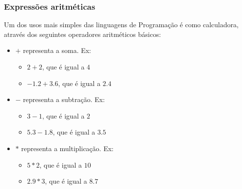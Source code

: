 \documentclass{beamer}
\begin{document}
\begin{frame}
    \frametitle{Expressões aritméticas}
        Um dos usos mais simples das linguagens de Programação é como
        calculadora, através dos seguintes operadores aritméticos básicos: 
        \begin{itemize}
            \item $+$ representa a soma. Ex:
            \begin{itemize}
                \item $2+2$, que é igual a $4$
                \item $-1.2+3.6$, que é igual a $2.4$
            \end{itemize}
            \item $-$ representa a subtração. Ex:
            \begin{itemize}
                \item $3-1$, que é igual a $2$
                \item $5.3-1.8$, que é igual a $3.5$
            \end{itemize}
            \item $*$ representa a multiplicação. Ex:
            \begin{itemize}
                \item $5*2$, que é igual a $10$
                \item $2.9*3$, que é igual a $8.7$
            \end{itemize}
        \end{itemize}
\end{frame}
\end{document}

